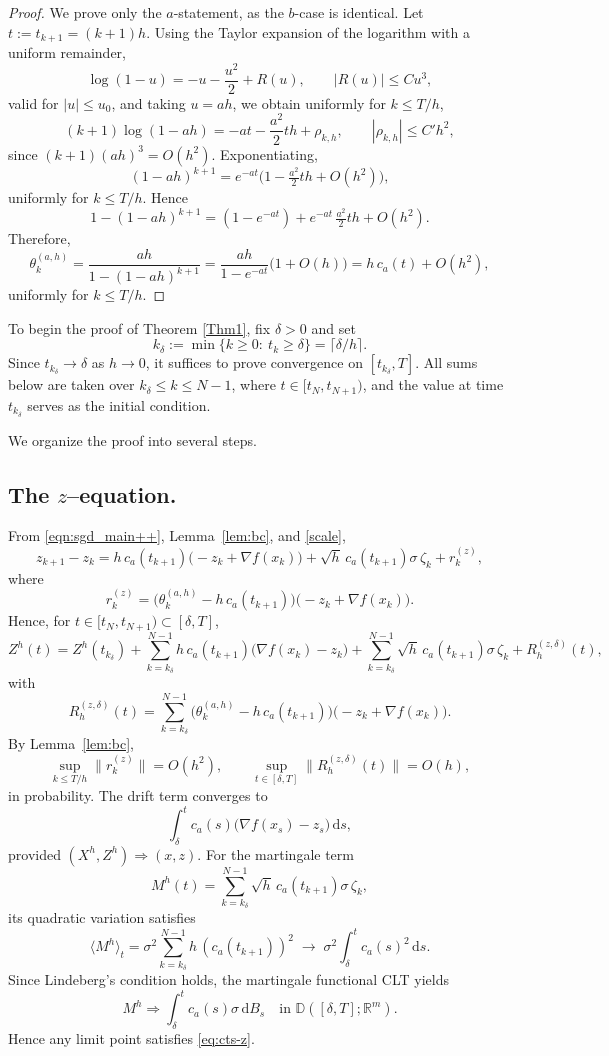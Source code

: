\documentclass[11pt, a4paper,leqno]{amsart}
\theoremstyle{definition}
\numberwithin{equation}{section}
\begin{document}
\begin{proof}
We prove only the $a$-statement, as the $b$-case is identical. Let $t:=t_{k+1}=(k+1)h$. Using the Taylor expansion of the logarithm with a uniform remainder,
\[
\log(1-u)=-u-\frac{u^2}{2}+R(u),\qquad |R(u)|\le C u^3,
\]
valid for $|u|\le u_0$, and taking $u=ah$, we obtain uniformly for $k\le T/h$,
\[
(k+1)\log(1-ah)
= -a t - \frac{a^2}{2}t h + \rho_{k,h},
\qquad |\rho_{k,h}|\le C' h^2,
\]
since $(k+1)(ah)^3 = O(h^2)$. Exponentiating,
\[
(1-ah)^{k+1}
= e^{-a t}\big(1 - \tfrac{a^2}{2}t h + O(h^2)\big),
\]
uniformly for $k\le T/h$. Hence
\[
1-(1-ah)^{k+1}
= (1-e^{-a t}) + e^{-a t}\,\tfrac{a^2}{2}t h + O(h^2).
\]
Therefore,
\[
\theta_k^{(a,h)}
= \frac{ah}{1-(1-ah)^{k+1}}
= \frac{ah}{1-e^{-a t}}
\big(1 + O(h)\big)
= h\,c_a(t) + O(h^2),
\]
uniformly for $k\le T/h$.
\end{proof}

To begin the proof of Theorem \ref{Thm1}, fix $\delta>0$ and set
\[
k_\delta:=\min\{k\ge 0:\ t_k\ge \delta\}=\lceil \delta/h\rceil.
\]
Since $t_{k_\delta}\to\delta$ as $h\to0$, it suffices to prove convergence on $[t_{k_\delta},T]$. All sums below are taken over $k_\delta\le k\le N-1$, where $t\in[t_N,t_{N+1})$, and the value at time $t_{k_\delta}$ serves as the initial condition.

We organize the proof into several steps.

\subsection{The $z$–equation.}
From \eqref{eqn:sgd_main++}, Lemma~\ref{lem:bc}, and \eqref{scale},
\[
z_{k+1}-z_k
=
h\,c_a(t_{k+1})\bigl(-z_k+\nabla f(x_k)\bigr)
+\sqrt h\,c_a(t_{k+1})\sigma\,\zeta_k
+r_k^{(z)},
\]
where
\[
r_k^{(z)}
=
\bigl(\theta_k^{(a,h)}-h\,c_a(t_{k+1})\bigr)\bigl(-z_k+\nabla f(x_k)\bigr).
\]
Hence, for $t\in[t_N,t_{N+1})\subset[\delta,T]$,
\[
Z^h(t)
=
Z^h(t_{k_\delta})
+\sum_{k=k_\delta}^{N-1} h\,c_a(t_{k+1})\bigl(\nabla f(x_k)-z_k\bigr)
+\sum_{k=k_\delta}^{N-1}\sqrt h\,c_a(t_{k+1})\sigma\,\zeta_k
+R_h^{(z,\delta)}(t),
\]
with
\[
R_h^{(z,\delta)}(t)
=
\sum_{k=k_\delta}^{N-1}
\bigl(\theta_k^{(a,h)}-h\,c_a(t_{k+1})\bigr)\bigl(-z_k+\nabla f(x_k)\bigr).
\]
By Lemma~\ref{lem:bc},
\[
\sup_{k\le T/h}\|r_k^{(z)}\|=O(h^2),
\qquad
\sup_{t\in[\delta,T]}\|R^{(z,\delta)}_h(t)\|=O(h),
\]
in probability. The drift term converges to
\[
\int_\delta^t c_a(s)\bigl(\nabla f(x_s)-z_s\bigr)\,\mathrm{d}s,
\]
provided $(X^h,Z^h)\Rightarrow (x,z)$. For the martingale term
\[
M^h(t) = \sum_{k=k_\delta}^{N-1} \sqrt{h}\,c_a(t_{k+1})\sigma\,\zeta_k,
\]
its quadratic variation satisfies
\[
\langle M^h\rangle_t
= \sigma^2 \sum_{k=k_\delta}^{N-1} h\,(c_a(t_{k+1}))^2
\;\longrightarrow\;
\sigma^2 \int_\delta^t c_a(s)^2\,\mathrm{d}s.
\]
Since Lindeberg’s condition holds, the martingale functional CLT yields
\[
M^h \Rightarrow \int_\delta^t c_a(s)\sigma\,\mathrm{d}B_s
\quad \text{in } \mathbb{D}([\delta,T];\mathbb{R}^m).
\]
Hence any limit point satisfies \eqref{eq:cts-z}.
\end{document}
